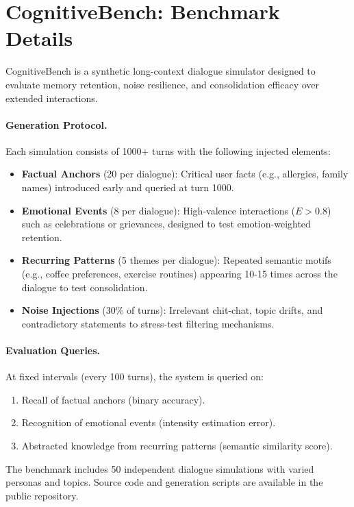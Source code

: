\appendix
\section{CognitiveBench: Benchmark Details}
\label{app:cognitivebench}

CognitiveBench is a synthetic long-context dialogue simulator designed to evaluate memory retention, noise resilience, and consolidation efficacy over extended interactions.

\paragraph{Generation Protocol.} Each simulation consists of 1000+ turns with the following injected elements:
\begin{itemize}
    \item \textbf{Factual Anchors} (20 per dialogue): Critical user facts (e.g., allergies, family names) introduced early and queried at turn 1000.
    \item \textbf{Emotional Events} (8 per dialogue): High-valence interactions ($E > 0.8$) such as celebrations or grievances, designed to test emotion-weighted retention.
    \item \textbf{Recurring Patterns} (5 themes per dialogue): Repeated semantic motifs (e.g., coffee preferences, exercise routines) appearing 10-15 times across the dialogue to test consolidation.
    \item \textbf{Noise Injections} (30\% of turns): Irrelevant chit-chat, topic drifts, and contradictory statements to stress-test filtering mechanisms.
\end{itemize}

\paragraph{Evaluation Queries.} At fixed intervals (every 100 turns), the system is queried on:
\begin{enumerate}
    \item Recall of factual anchors (binary accuracy).
    \item Recognition of emotional events (intensity estimation error).
    \item Abstracted knowledge from recurring patterns (semantic similarity score).
\end{enumerate}

The benchmark includes 50 independent dialogue simulations with varied personas and topics. Source code and generation scripts are available in the public repository.

